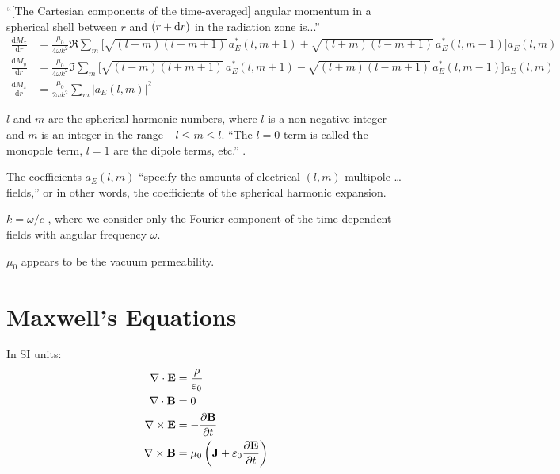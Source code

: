 \documentclass{book}
\newcommand{\deriv}[2]{\frac{\text{d}{#1}}{\text{d}{#2}}}
\newcommand{\pd}[2]{\frac{\partial {#1}}{\partial {#2}}}
\begin{document}
``[The Cartesian components of the time-averaged] angular momentum in a spherical shell between $r$ and $(r + {\rm d}r)$ in the radiation zone is...'' \citep[][see their Eqs. (9.141) to (9.143)]{Jackson1975}
\begin{equation}
    \begin{aligned}
        \deriv{M_x}{r}
            &= \frac{\mu_0}{4\omega k^2} \Re \sum_m \bigg[
                \sqrt{(l-m)(l+m+1)} \, a_E^\ast(l,m+1) +
                \sqrt{(l+m)(l-m+1)} \, a_E^\ast(l,m-1) \bigg] a_E(l,m) \\
        \deriv{M_y}{r}
            &= \frac{\mu_0}{4\omega k^2} \Im \sum_m \bigg[
                \sqrt{(l-m)(l+m+1)} \, a_E^\ast(l,m+1) -
                \sqrt{(l+m)(l-m+1)} \, a_E^\ast(l,m-1) \bigg] a_E(l,m) \\
        \deriv{M_z}{r}
            &= \frac{\mu_0}{2\omega k^2} \sum_m \left|a_E(l,m)\right|^2
    \end{aligned}
\end{equation}

$l$ and $m$ are the spherical harmonic numbers, where $l$ is a non-negative integer and $m$ is an integer in the range $-l \le m \le l$.
``The $l=0$ term is called the monopole term, $l=1$ are the dipole terms, etc.'' \citep[][\S4.1]{Jackson1975}.

The coefficients $a_E(l,m)$ ``specify the amounts of electrical $(l,m)$ multipole \dots fields,'' or in other words, the coefficients of the spherical harmonic expansion.

$k = \omega/c$ \citep[defined after Eq. (9.107) in][]{Jackson1975}, where we consider only the Fourier component of the time dependent fields with angular frequency $\omega$.

$\mu_0$ appears to be the vacuum permeability.

\section{Maxwell's Equations}

In SI units:
\begin{align}
    \nabla\cdot{\bf E} &= \frac{\rho}{\varepsilon_0} \\
    \nabla\cdot{\bf B} &= 0 \\
    \nabla\times{\bf E} &= -\pd{\bf B}{t} \\
    \nabla\times{\bf B} &= \mu_0\left({\bf J} + \varepsilon_0 \pd{\bf E}{t}\right)
\end{align}
\end{document}
